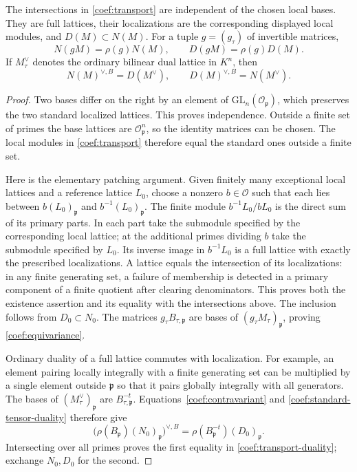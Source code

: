 \begin{lemma}\label{coef:transport-lattices}
The intersections in \eqref{coef:transport} are independent of the
chosen local bases. They are full lattices, their localizations are
the corresponding displayed local modules, and $D(M)\subset N(M)$.
For a tuple $g=(g_\tau)$ of invertible matrices,
\begin{equation}\label{coef:equivariance}
                  N(gM)=\rho(g)N(M),\qquad D(gM)=\rho(g)D(M).
\end{equation}
If $M_\tau^\vee$ denotes the ordinary bilinear dual lattice in $K^n$,
then
\begin{equation}\label{coef:transport-duality}
                     N(M)^{\vee,B}=D(M^\vee),
              \qquad D(M)^{\vee,B}=N(M^\vee).
\end{equation}
\end{lemma}
\begin{proof}
Two bases differ on the right by an element of
$\mathrm{GL}_n(\mathcal O_{\mathfrak p})$, which preserves the two
standard localized lattices. This proves independence.
Outside a finite set of primes the base lattices are
$\mathcal O_{\mathfrak p}^n$, so the identity matrices can be chosen.
The local modules in \eqref{coef:transport} therefore equal the
standard ones outside a finite set.

Here is the elementary patching argument. Given finitely many
exceptional local lattices and a reference lattice $L_0$, choose a
nonzero $b\in\mathcal O$ such that each lies between
$b(L_0)_{\mathfrak p}$ and $b^{-1}(L_0)_{\mathfrak p}$.
The finite module $b^{-1}L_0/bL_0$ is the direct sum of its primary
parts. In each part take the submodule specified by the corresponding
local lattice; at the additional primes dividing $b$ take the
submodule specified by $L_0$. Its inverse image in $b^{-1}L_0$ is a
full lattice with exactly the prescribed localizations. A lattice
equals the intersection of its localizations: in any finite generating
set, a failure of membership is detected in a primary component of
a finite quotient after clearing denominators. This proves both the
existence assertion and its equality with the intersections above.
The inclusion follows from $D_0\subset N_0$.
The matrices $g_\tau B_{\tau,\mathfrak p}$ are bases of
$(g_\tau M_\tau)_{\mathfrak p}$, proving
\eqref{coef:equivariance}.

Ordinary duality of a full lattice commutes with localization. For
example, an element pairing locally integrally with a finite generating
set can be multiplied by a single element outside $\mathfrak p$ so
that it pairs globally integrally with all generators. The bases of
$(M_\tau^\vee)_{\mathfrak p}$ are $B_{\tau,\mathfrak p}^{-t}$.
Equations~\eqref{coef:contravariant} and
\eqref{coef:standard-tensor-duality} therefore give
\[
 \bigl(\rho(B_{\mathfrak p})(N_0)_{\mathfrak p}\bigr)^{\vee,B}
     =\rho(B_{\mathfrak p}^{-t})(D_0)_{\mathfrak p}.
\]
Intersecting over all primes proves the first equality in
\eqref{coef:transport-duality}; exchange $N_0,D_0$ for the second.
\end{proof}

